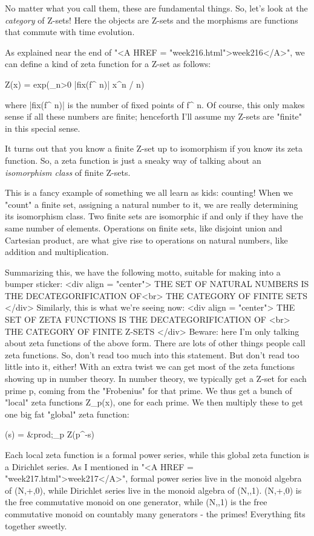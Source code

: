 No matter what you call them, these are fundamental things.  So, let's 
look at the \emph{category} of Z-sets!  Here the objects are Z-sets and the 
morphisms are functions that commute with time evolution.  

As explained near the end of "<A HREF =
"week216.html">week216</A>", we can define a kind of zeta
function for a Z-set as follows:

Z(x) = exp(\sum_{n>0} |fix(f^{ n})| x^{n} / n)

where |fix(f^{ n})| is the number of fixed points of 
f^{ n}.  Of course, this
only makes sense if all these numbers are finite; henceforth I'll assume 
my Z-sets are "finite" in this special sense.  

It turns out that you know a finite Z-set up to isomorphism if you know its 
zeta function.  So, a zeta function is just a sneaky way of talking about 
an \emph{isomorphism class} of finite Z-sets.  


This is a fancy example of something we all learn as kids: counting!
When we "count" a finite set, assigning a natural number to
it, we are really determining its isomorphism class.  Two finite sets
are isomorphic if and only if they have the same number of elements.
Operations on finite sets, like disjoint union and Cartesian product,
are what give rise to operations on natural numbers, like addition and
multiplication.

Summarizing this, we have the following motto, suitable for making into
a bumper sticker:
<div align = "center">
  THE SET OF NATURAL NUMBERS IS THE DECATEGORIFICATION OF<br>
                THE CATEGORY OF FINITE SETS
</div>
Similarly, this is what we're seeing now:
<div align = "center">
  THE SET OF ZETA FUNCTIONS IS THE DECATEGORIFICATION OF  <br>
               THE CATEGORY OF FINITE Z-SETS
</div>
Beware: here I'm only talking about zeta functions of the above form.  There 
are lots of other things people call zeta functions.   So, don't read too 
much into this statement.  But don't read too little into it, either!   With 
an extra twist we can get most of the zeta functions showing up in number 
theory.  In number theory, we typically get a Z-set for each prime p, 
coming from the "Frobenius" for that prime.  We thus get a bunch of "local" 
zeta functions Z_{p}(x), one for each prime.  We then multiply these to get 
one big fat "global" zeta function:

\zeta (s) = &prod;_{p} Z(p^{-s})

Each local zeta function is a formal power series, while this global
zeta function is a Dirichlet series.  As I mentioned in "<A HREF
= "week217.html">week217</A>", formal power series live in the
monoid algebra of (N,+,0), while Dirichlet series live in the monoid
algebra of (N,\times ,1).  (N,+,0) is the free commutative monoid on one
generator, while (N,\times ,1) is the free commutative monoid on countably
many generators - the primes!  Everything fits together sweetly.

